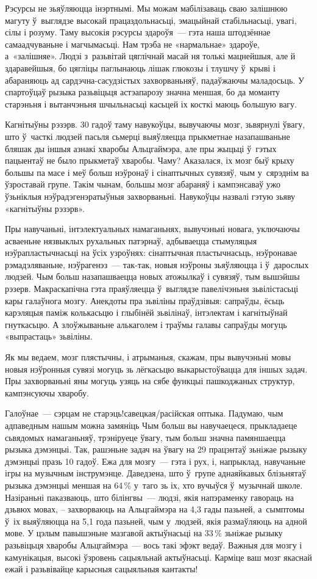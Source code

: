 Рэсурсы не зьяўляюцца інэртнымі. Мы можам мабілізаваць сваю залішнюю магуту ў~выглядзе высокай працаздольнасьці, эмацыйнай стабільнасьці, увагі, сілы і розуму. Таму высокія рэсурсы здароўя~--- гэта наша штодзённае самаадчуваньне і магчымасьці. Нам трэба не «нармальнае» здароўе, а~«залішняе». Людзі з~разьвітай цяглічнай масай ня толькі мацнейшыя, але й здаравейшыя, бо цягліцы паглынаюць лішак глюкозы і тлушчу ў~крыві і абараняюць ад сардэчна-сасудзістых захворваньняў, падаўжаючы маладосьць. У спартоўцаў рызыка разьвіцьця астэапарозу значна меншая, бо да моманту старэньня і вытанчэньня шчыльнасьці касьцей іх косткі маюць большую вагу.

Кагнітыўны рэзэрв. 30 гадоў таму навукоўцы, вывучаючы мозг, зьвярнулі ўвагу, што ў~часткі людзей пасьля сьмерці выяўляецца прыкметнае назапашваньне бляшак ды іншыя азнакі хваробы Альцгаймэра, але пры жыцьці ў~гэтых пацыентаў не было прыкметаў хваробы. Чаму? Аказалася, іх мозг быў крыху большы па масе і меў больш нэўронаў і сінаптычных сувязяў, чым у~сярэднім ва ўзроставай групе. Такім чынам, большы мозг абараняў і кампэнсаваў ужо ўзьніклыя нэўрадэгенэратыўныя захворваньні. Навукоўцы назвалі гэтую зьяву «кагнітыўны рэзэрв».

Пры навучаньні, інтэлектуальных намаганьнях, вывучэньні новага, уключаючы асваеньне нязвыклых рухальных патэрнаў, адбываецца стымуляцыя нэўрапластычнасьці на ўсіх узроўнях: сінаптычная пластычнасьць, нэўронавае рэмадэляваньне, нэўрагенэз~--- так-так, новыя нэўроны зьяўляюцца і ў~дарослых людзей. Чым больш назапашваецца новых атожылкаў і сувязяў, тым вышэйшы рэзерв. Макраскапічна гэта праяўляецца ў~выглядзе павелічэньня зьвілістасьці кары галаўнога мозгу. Анекдоты пра зьвіліны праўдзівыя: сапраўды, ёсьць карэляцыя паміж колькасьцю і глыбінёй зьвілінаў, інтэлектам і кагнітыўнай гнуткасьцю. А злоўжываньне алькаголем і траўмы галавы сапраўды могуць «выпрастаць» зьвіліны.

Як мы ведаем, мозг плястычны, і атрыманыя, скажам, пры вывучэньні мовы новыя нэўронныя сувязі могуць зь лёгкасьцю выкарыстоўвацца для іншых задач. Пры захворваньні яны могуць узяць на сябе функцыі пашкоджаных структур, кампэнсуючы хваробу.

Галоўнае~--- сэрцам не старэць!савецкая/расійская оптыка. Падумаю, чым адпаведным нашым можна замяніць Чым больш вы навучаецеся, прыкладаеце сьвядомых намаганьняў, трэніруеце ўвагу, тым больш значна памяншаецца рызыка дэмэнцыі. Так, рашэньне задач на ўвагу на 29 працэнтаў зьніжае рызыку дэмэнцыі празь 10 гадоў. Ежа для мозгу~--- гэта і рух, і, напрыклад, навучаньне ігры на музычным інструмэнце. Даведзена, што ў~групе аднаяйкавых блізьнятаў рызыка дэмэнцыі меншая на 64\,\% у~таго зь іх, хто вучыўся ў~музычнай школе. Назіраньні паказваюць, што білінгвы~--- людзі, якія напэраменку гавораць на дзьвюх мовах, -- захворваюць на Альцгаймэра на 4,3 гады пазьней, а~сымптомы ў~іх выяўляюцца на 5,1 года пазьней, чым у~людзей, якія размаўляюць на адной мове. У цэлым павышэньне мазгавой актыўнасьці на 33\,\% зьніжае рызыку разьвіцьця хваробы Альцгаймэра~--- вось такі эфэкт ведаў. Важныя для мозгу і камунікацыя, высокі ўзровень сацыяльнай актыўнасьці. Карміце ваш мозг якаснай ежай і разьвівайце карысныя сацыяльныя кантакты!

